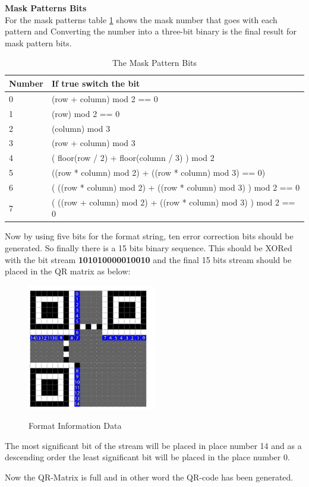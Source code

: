 \textbf{Mask Patterns Bits}\\

For the mask patterns table \ref{table2.4} shows the mask number that goes with each pattern and Converting the number into a three-bit binary is the final result for mask pattern bits.

\begin{table}[h!]
  \centering
          \caption{The Mask Pattern Bits}
         \label{table2.4}
    \begin{tabular}{| l | l |}
    \hline
    Number & If true switch the bit \\ \hline
    0 & (row + column) mod 2 == 0  \\ \hline
    1 & (row) mod 2 == 0  \\ \hline
    2 & (column) mod 3 \\ \hline
    3 & (row + column) mod 3 \\ \hline
    4 & ( floor(row / 2) + floor(column / 3) ) mod 2 \\ \hline
    5 & ((row * column) mod 2) + ((row * column) mod 3) == 0)  \\ \hline
    6 & ( ((row * column) mod 2) + ((row * column) mod 3) ) mod 2 == 0 \\ \hline
    7 & ( ((row + column) mod 2) + ((row * column) mod 3) ) mod 2 == 0 \\ \hline
    \end{tabular}

\end{table}

Now by using five bits for the format string, ten error correction bits should be generated. So finally there is a 15 bits binary sequence. This should be XORed with the bit stream \textbf{101010000010010} and the final 15 bits stream should be placed in the QR matrix as below:


\begin{figure}[H]
  \caption{Format Information Data\cite{Thonky}}
  \centering
    \includegraphics[width=0.5\textwidth]{figures/Formatinformation.jpg}
    \label{fig:2.10}
\end{figure}

The most significant bit of the stream will be placed in place number 14 and as a descending order the least significant bit will be placed in the place number 0.

Now the QR-Matrix is full and in other word the QR-code has been generated.

